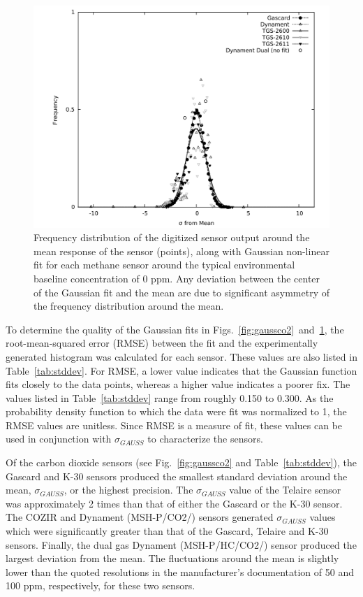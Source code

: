 \documentclass[times]{joehreview}
\begin{document}
	\begin{figure}[!t]
		\centering
		\includegraphics[width=\columnwidth]{honey8.pdf}
		\caption{Frequency distribution of the digitized sensor output around the mean response of the sensor (points), along with Gaussian non-linear fit for each methane sensor around the typical environmental baseline concentration of 0 ppm.  Any deviation between the center of the Gaussian fit and the mean are due to significant asymmetry of the frequency distribution around the mean.}
		\label{fig:gaussch4}
	\end{figure}
	
	To determine the quality of the Gaussian fits in Figs.~\ref{fig:gaussco2}~and~\ref{fig:gaussch4}, the root-mean-squared error (RMSE)  between the fit and the experimentally generated histogram was calculated for each sensor.  These values are also listed in Table~\ref{tab:stddev}.  For RMSE, a lower value indicates that the Gaussian function fits closely to the data points, whereas a higher value indicates a poorer fix.   The values listed in Table~\ref{tab:stddev} range from roughly 0.150 to 0.300.  As the probability density function to which the data were fit was normalized to 1, the RMSE values are unitless.  Since RMSE is a measure of fit, these values can be used in conjunction with $\sigma_{GAUSS}$ to characterize the sensors.
	
	Of the carbon dioxide sensors (see Fig.~\ref{fig:gaussco2} and Table~\ref{tab:stddev}), the Gascard and K-30 sensors produced the smallest standard deviation around the mean, $\sigma_{GAUSS}$, or the highest precision.  The $\sigma_{GAUSS}$ value of the Telaire sensor was approximately 2 times than that of either the Gascard or the K-30 sensor.  The COZIR and Dynament (MSH-P/CO2/) sensors generated $\sigma_{GAUSS}$ values which were significantly greater than that of the Gascard, Telaire and K-30 sensors.  Finally, the dual gas Dynament (MSH-P/HC/CO2/) sensor produced the largest deviation from the mean. The fluctuations around the mean is slightly lower than the quoted resolutions in the manufacturer's documentation of 50 and 100 ppm, respectively, for these two sensors.
	
\end{document}
